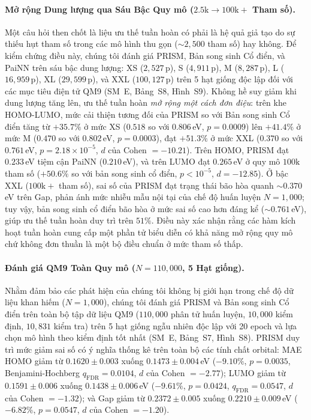 \documentclass[10pt,twocolumn,letterpaper]{article}
\begin{document}
\paragraph{Mở rộng Dung lượng qua Sáu Bậc Quy mô ($2.5\mathrm{k} \to 100\mathrm{k}+$ Tham số).}
Một câu hỏi then chốt là liệu ưu thế tuần hoàn có phải là hệ quả giả tạo do sự thiếu hụt tham số trong các mô hình thu gọn ($\sim 2{,}500$ tham số) hay không. Để kiểm chứng điều này, chúng tôi đánh giá PRISM, Bản song sinh Cổ điển, và PaiNN trên sáu bậc dung lượng: XS ($2{,}527$\,p), S ($4{,}911$\,p), M ($8{,}287$\,p), L ($16{,}959$\,p), XL ($29{,}599$\,p), và XXL ($100{,}127$\,p) trên 5 hạt giống độc lập đối với các mục tiêu điện tử QM9 (SM~E, Bảng~S8, Hình~S9). 
Không hề suy giảm khi dung lượng tăng lên, ưu thế tuần hoàn \textit{mở rộng một cách đơn điệu}: trên khe HOMO-LUMO, mức cải thiện tương đối của PRISM so với Bản song sinh Cổ điển tăng từ $+35.7\%$ ở mức XS ($0.518$ so với $0.806$\,eV, $p = 0.0009$) lên $+41.4\%$ ở mức M ($0.470$ so với $0.802$\,eV, $p = 0.0003$), đạt $\mathbf{+51.3\%}$ ở mức XXL ($0.370$ so với $0.761$\,eV, $p = 2.18 \times 10^{-5}$, $d$ của Cohen $= -10.21$). Trên HOMO, PRISM đạt $0.233$\,eV tiệm cận PaiNN ($0.210$\,eV), và trên LUMO đạt $0.265$\,eV ở quy mô $100\mathrm{k}$ tham số ($+50.6\%$ so với bản song sinh cổ điển, $p < 10^{-5}$, $d = -12.85$). Ở bậc XXL ($100\mathrm{k}+$ tham số), sai số của PRISM đạt trạng thái bão hòa quanh $\sim 0.370$\,eV trên Gap, phản ánh mức nhiễu mẫu nội tại của chế độ huấn luyện $N = 1{,}000$; tuy vậy, bản song sinh cổ điển bão hòa ở mức sai số cao hơn đáng kể ($\sim 0.761$\,eV), giúp ưu thế tuần hoàn duy trì trên $51\%$. Điều này xác nhận rằng các hàm kích hoạt tuần hoàn cung cấp một phần tử biểu diễn có khả năng mở rộng quy mô chứ không đơn thuần là một bộ điều chuẩn ở mức tham số thấp.

\paragraph{Đánh giá QM9 Toàn Quy mô ($N = 110{,}000$, 5 Hạt giống).}
Nhằm đảm bảo các phát hiện của chúng tôi không bị giới hạn trong chế độ dữ liệu khan hiếm ($N = 1{,}000$), chúng tôi đánh giá PRISM và Bản song sinh Cổ điển trên toàn bộ tập dữ liệu QM9 ($110{,}000$ phân tử huấn luyện, $10{,}000$ kiểm định, $10{,}831$ kiểm tra) trên 5 hạt giống ngẫu nhiên độc lập với 20 epoch và lựa chọn mô hình theo kiểm định tốt nhất (SM~E, Bảng~S7, Hình~S8). PRISM duy trì mức giảm sai số có ý nghĩa thống kê trên toàn bộ các tính chất orbital: MAE HOMO giảm từ $0.1620 \pm 0.003$ xuống $\mathbf{0.1473 \pm 0.004}$\,eV ($-9.10\%$, $p = 0.0035$, Benjamini-Hochberg $q_{\mathrm{FDR}} = 0.0104$, $d$ của Cohen $= -2.77$); LUMO giảm từ $0.1591 \pm 0.006$ xuống $\mathbf{0.1438 \pm 0.006}$\,eV ($-9.61\%$, $p = 0.0424$, $q_{\mathrm{FDR}} = 0.0547$, $d$ của Cohen $= -1.32$); và Gap giảm từ $0.2372 \pm 0.005$ xuống $\mathbf{0.2210 \pm 0.009}$\,eV ($-6.82\%$, $p = 0.0547$, $d$ của Cohen $= -1.20$).
\end{document}
